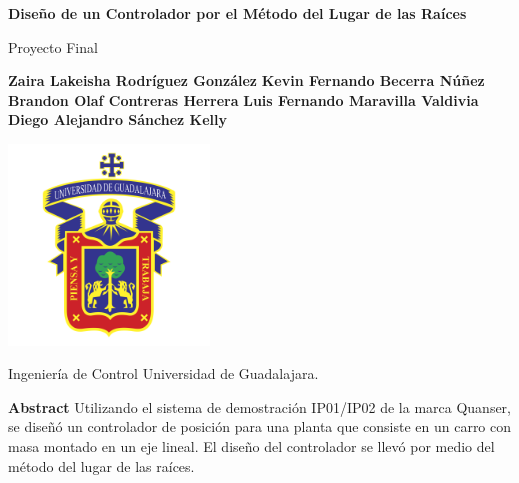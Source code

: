 \documentclass[12pt,a4paper]{article}
\begin{document}
	
	\begin{titlepage}
		\begin{center}
      \vspace{2cm}
      
      \huge
      \textbf{Diseño de un Controlador por el Método del Lugar de las Raíces}
      
      \vspace{.5cm}
      
      \large
      Proyecto Final
      
      \vspace{2cm}

      \small
      \textbf{Zaira Lakeisha Rodríguez González} \break
      \textbf{Kevin Fernando Becerra Núñez} \break
      \textbf{Brandon Olaf Contreras Herrera} \break
      \textbf{Luis Fernando Maravilla Valdivia} \break
      \textbf{Diego Alejandro Sánchez Kelly} \break

      \vspace{1cm}
      
      \includegraphics[width=0.4\textwidth, keepaspectratio]{./Resources/UDG.png}
      
      \vfill
      
      \large
      Ingeniería de Control \break
      Universidad de Guadalajara.

		\end{center}
	\end{titlepage}

	\pagebreak 
	
    \begin{center}
      \textbf{Abstract} \break
      Utilizando el sistema de demostración IP01/IP02 de la marca Quanser, se diseñó un controlador de posición 
      para una planta que consiste en un carro con masa montado en un eje lineal. El diseño del controlador se llevó 
      por medio del método del lugar de las raíces. 
    \end{center}
\end{document}
